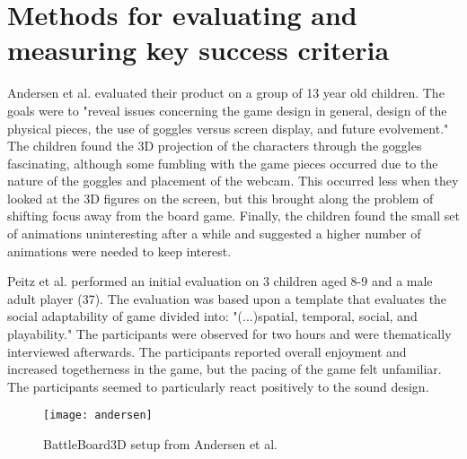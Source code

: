 
\section{Methods for evaluating and measuring key success criteria}
Andersen et al. \citep{andersen_designing_2004} evaluated their product on a group of 13 year old children. The goals were to "reveal issues concerning the game design in general, design of the physical pieces, the use of goggles versus screen display, and future evolvement." The children found the 3D projection of the characters through the goggles fascinating, although some fumbling with the game pieces occurred due to the nature of the goggles and placement of the webcam. This occurred less when they looked at the 3D figures on the screen, but this brought along the problem of shifting focus away from the board game.
Finally, the children found the small set of animations uninteresting after a while and suggested a higher number of animations were needed to keep interest.

Peitz et al. \citep{peitzWizards2006} performed an initial evaluation on 3 children aged 8-9 and a male adult player (37). The evaluation was based upon a template that evaluates the social adaptability of game divided into: "(...)spatial, temporal, social, and playability." The participants were observed for two hours and were thematically interviewed afterwards. The participants reported overall enjoyment and increased togetherness in the game, but the pacing of the game felt unfamiliar. The participants seemed to particularly react positively to the sound design. 

\begin{figure}[!h]
\centering	
\texttt{[image: andersen]}
\caption{BattleBoard3D setup from Andersen et al.  \citep{andersen_designing_2004}}
\label{fig:andersen}
\end{figure}